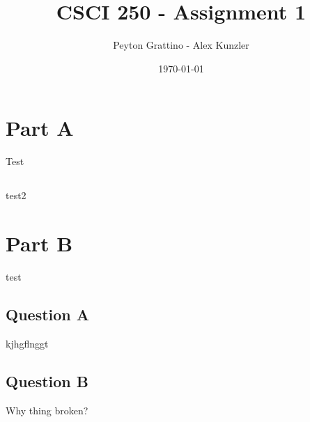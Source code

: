 \documentclass[12pt]{amsart}
\title{CSCI 250 - Assignment 1}
\author{Peyton Grattino - Alex Kunzler}
\date{\today} %
\begin{document}
\maketitle
\tableofcontents

\pagebreak

\section{Part A}
Test

\subsection{}
test2

\pagebreak

\section{Part B}
test
\subsection{Question A}
kjhgflnggt

\subsection{Question B}
Why thing broken?
\end{document}
